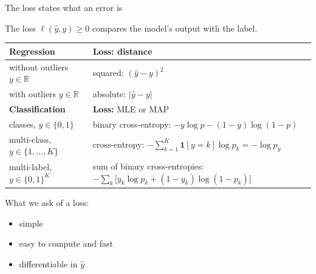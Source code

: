 \documentclass[10pt]{beamer}
\begin{document}
\begin{frame}{The loss states what an error is}

\raggedright\footnotesize
\smallskip
The loss $\ell(\hat y,y)\ge0$ compares the model's output with the label.

\smallskip
\renewcommand{\arraystretch}{1.25}
\begin{tabularx}{\textwidth}{@{}>{\raggedright\arraybackslash}p{} >{\raggedright\arraybackslash}X@{}}
\toprule
\textbf{Regression}& \textbf{Loss:} distance \\
\midrule
without outliers $y\in\mathbb{R}$ & squared: $(\hat y-y)^2$ \\
with outliers  $y\in\mathbb{R}$ & absolute: $|\hat y-y|$ \\
\midrule
\textbf{Classification} & \textbf{Loss:} MLE or MAP \\
\midrule
2 classes, $y\in\{0,1\}$ & binary cross-entropy: $-y\log p-(1-y)\log(1-p)$ \\
multi-class, $y\in\{1,\dots,K\}$ & cross-entropy: $-\sum_{k=1}^K\mathbf 1[y=k]\log p_k=-\log p_y$ \\
multi-label, $y\in\{0,1\}^K$ & sum of binary cross-entropies:\newline \mbox{$-\sum_k\big[y_k\log p_k+(1-y_k)\log(1-p_k)\big]$} \\
\bottomrule
\end{tabularx}

\medskip
What we ask of a loss:
\begin{itemize}
\item \alert{simple}
\item \alert{easy to compute and fast}
\item \alert{differentiable} in $\hat y$
\end{itemize}
\end{frame}
\end{document}
